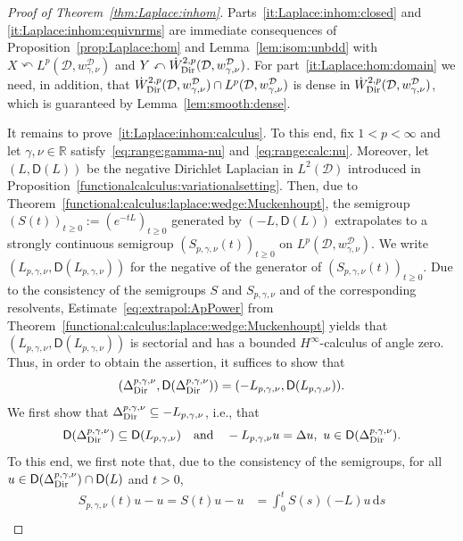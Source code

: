 \documentclass[12pt,a4paper, reqno]{amsart}
\theoremstyle{plain}
\theoremstyle{definition}
\theoremstyle{remark}
\numberwithin{equation}{section}
\newcommand{\1}{\mathbbm{1}}
\newcommand{\R}{\ensuremath{\mathbb{R}}}
\newcommand{\calD}{\ensuremath{\mathcal{D}}}
\newcommand{\sfD}{\ensuremath{\mathsf{D}}}
\newcommand{\Dir}{\textup{Dir}}
\begin{document}
\begin{proof}[Proof of Theorem~\ref{thm:Laplace:inhom}]
Parts~\ref{it:Laplace:inhom:closed} and \ref{it:Laplace:inhom:equivnrms} are immediate consequences of Proposition~\ref{prop:Laplace:hom} and Lemma~\ref{lem:isom:unbdd} with $X\curvearrowleft L^p(\calD,w_{\gamma,\nu}^\calD)$ and $Y\curvearrowleft \Dot W^{2,p}_\Dir(\calD,w_{\gamma,\nu}^\calD)$. 
For part~\ref{it:Laplace:hom:domain} we need, in addition, that $\Dot{W}^{2,p}_\Dir(\calD,w_{\gamma,\nu}^\calD)\cap L^p(\calD,w_{\gamma,\nu}^\calD)$ is dense in $\Dot W^{2,p}_\Dir (\calD,w_{\gamma,\nu}^\calD)$, which is guaranteed by Lemma~\ref{lem:smooth:dense}.

It remains to prove~\ref{it:Laplace:inhom:calculus}.
To this end, fix $1<p<\infty$ and let $\gamma,\nu\in\R$ satisfy~\eqref{eq:range:gamma-nu} and~\eqref{eq:range:calc:nu}.
Moreover, let $(L,\sfD(L))$ be the negative Dirichlet Laplacian in $L^2(\calD)$ introduced in Proposition~\ref{functionalcalculus:variationalsetting}.
Then, due to Theorem~\ref{functional:calculus:laplace:wedge:Muckenhoupt}, the semigroup $(S(t))_{t\geq 0}:=(e^{-tL})_{t\geq 0}$ generated by $(-L,\sfD(L))$ extrapolates to a strongly continuous semigroup $(S_{p,\gamma,\nu}(t))_{t\geq 0}$ on $L^p(\calD,w_{\gamma,\nu}^\calD)$. We write $(L_{p,\gamma,\nu},\sfD(L_{p,\gamma,\nu}))$ for the negative of the generator of $(S_{p,\gamma,\nu}(t))_{t\geq 0}$. Due to the consistency of the semigroups $S$ and $S_{p,\gamma,\nu}$ and of the corresponding resolvents, Estimate~\eqref{eq:extrapol:ApPower} from Theorem~\ref{functional:calculus:laplace:wedge:Muckenhoupt} yields that $(L_{p,\gamma,\nu},\sfD(L_{p,\gamma,\nu}))$ is sectorial and has a bounded $H^\infty$-calculus of angle zero. Thus, in order to obtain the assertion, it suffices to show that
\[
(\Delta_\Dir^{p,\gamma,\nu},\sfD(\Delta_\Dir^{p,\gamma,\nu}))
= 
(-L_{p,\gamma,\nu},\sfD(L_{p,\gamma,\nu})).
\]
We first show that $\Delta_\Dir^{p,\gamma,\nu}\subseteq -L_{p,\gamma,\nu}$, i.e., that
\begin{equation}\label{eq:inclusion1}
\sfD(\Delta_\Dir^{p,\gamma,\nu})\subseteq \sfD(L_{p,\gamma,\nu}) 
\quad\text{and}\quad
-L_{p,\gamma,\nu}u=\Delta u,\,\, u\in \sfD(\Delta_\Dir^{p,\gamma,\nu}).    
\end{equation}
To this end,
we first note that,
due to the consistency of the semigroups, 
for all $u\in \sfD(\Delta_\Dir^{p,\gamma,\nu}) \cap \sfD(L)$ and $t>0$,
\begin{align*}
S_{p,\gamma,\nu}(t)u - u
=
S(t)u - u
&=
\int_0^t S(s)(-L)u\,\mathrm{d}s\\

\end{align*}
\end{proof}
\end{document}
